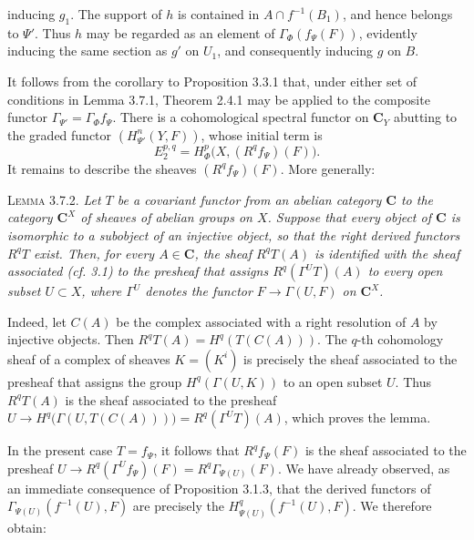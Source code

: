 
\noindent inducing $g_1$. The support of $h$ is contained in
$A\cap f^{-1}(B_1)$, and hence belongs to $\Psi'$. Thus $h$ may be regarded
as an element of $\Gamma_\Phi(f_\Psi(F))$, evidently inducing the same section
as $g'$ on $U_1$, and consequently inducing $g$ on $B$.

It follows from the corollary to Proposition 3.3.1 that, under either set of
conditions in Lemma 3.7.1, Theorem 2.4.1 may be applied to the composite
functor $\Gamma_{\Psi'}=\Gamma_\Phi f_\Psi$. There is a cohomological spectral
functor on $\mathbf C_Y$ abutting to the graded functor $(H^n_{\Psi'}(Y,F))$, whose
initial term is
\[
E_2^{p,q}=H^p_\Phi\bigl(X,(R^qf_\Psi)(F)\bigr).
\]
It remains to describe the sheaves $(R^qf_\Psi)(F)$. More generally:

\textsc{Lemma 3.7.2.} \textit{Let $T$ be a covariant functor
from an abelian category $\mathbf C$ to the category $\mathbf C^X$ of sheaves of abelian
groups on $X$. Suppose that every object of $\mathbf C$ is isomorphic to a subobject
of an injective object, so that the right derived functors $R^qT$ exist. Then,
for every $A\in\mathbf C$, the sheaf $R^qT(A)$ is identified with the sheaf associated
\textup{(}cf. \textup{3.1)} to the presheaf that assigns $R^q(\Gamma^U T)(A)$ to every open
subset $U\subset X$, where $\Gamma^U$ denotes the functor
$F\to\Gamma(U,F)$ on $\mathbf C^X$.}

Indeed, let $C(A)$ be the complex associated with a right resolution of $A$ by
injective objects. Then $R^qT(A)=H^q(T(C(A)))$. The $q$-th cohomology sheaf of
a complex of sheaves $K=(K^i)$ is precisely the sheaf associated to the
presheaf that assigns the group $H^q(\Gamma(U,K))$ to an open subset $U$.
Thus $R^qT(A)$ is the sheaf associated to the presheaf
$U\to H^q\bigl(\Gamma(U,T(C(A)))\bigr)
=R^q(\Gamma^U T)(A)$,
which proves the lemma.

In the present case $T=f_\Psi$, it follows that $R^qf_\Psi(F)$ is the sheaf
associated to the presheaf
$U\to R^q(\Gamma^U f_\Psi)(F)=R^q\Gamma_{\Psi(U)}(F)$.
We have already observed, as an immediate consequence of Proposition 3.1.3,
that the derived functors of
$\Gamma_{\Psi(U)}(f^{-1}(U),F)$ are precisely the
$H^q_{\Psi(U)}(f^{-1}(U),F)$. We therefore obtain:

